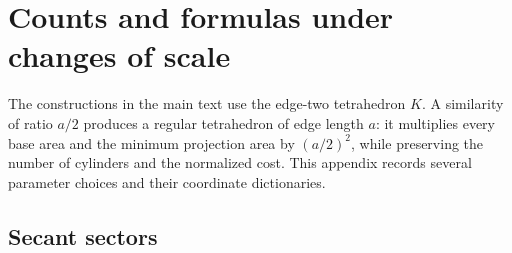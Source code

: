 \section{Counts and formulas under changes of scale}
\label{ext:scaling-specializations}

The constructions in the main text use the edge-two tetrahedron $K$.
A similarity of ratio $a/2$ produces a regular tetrahedron of edge length
$a$: it multiplies every base area and the minimum projection area by
$(a/2)^2$, while preserving the number of cylinders and the normalized
cost.  This appendix records several parameter choices and their
coordinate dictionaries.

\subsection{Secant sectors}
\label{ext:secant-specializations}

